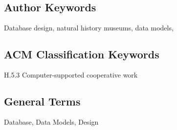 \subsection{Author Keywords}
Database design, natural history museums, data models, 
\subsection{ACM Classification Keywords}
H.5.3 Computer-supported cooperative work
\subsection{General Terms}
Database, Data Models, Design